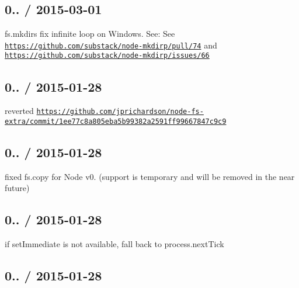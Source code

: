 \subsection*{0.. / 2015-\/03-\/01 }


\begin{DoxyItemize}
\item {\ttfamily fs.\+mkdirs} fix infinite loop on Windows. See\+: See \href{https://github.com/substack/node-mkdirp/pull/74}{\tt https\+://github.\+com/substack/node-\/mkdirp/pull/74} and \href{https://github.com/substack/node-mkdirp/issues/66}{\tt https\+://github.\+com/substack/node-\/mkdirp/issues/66}
\end{DoxyItemize}

\subsection*{0.. / 2015-\/01-\/28 }


\begin{DoxyItemize}
\item reverted \href{https://github.com/jprichardson/node-fs-extra/commit/1ee77c8a805eba5b99382a2591ff99667847c9c9}{\tt https\+://github.\+com/jprichardson/node-\/fs-\/extra/commit/1ee77c8a805eba5b99382a2591ff99667847c9c9}
\end{DoxyItemize}

\subsection*{0.. / 2015-\/01-\/28 }


\begin{DoxyItemize}
\item fixed {\ttfamily fs.\+copy} for Node v0. (support is temporary and will be removed in the near future)
\end{DoxyItemize}

\subsection*{0.. / 2015-\/01-\/28 }


\begin{DoxyItemize}
\item if {\ttfamily set\+Immediate} is not available, fall back to {\ttfamily process.\+next\+Tick}
\end{DoxyItemize}

\subsection*{0.. / 2015-\/01-\/28 }


